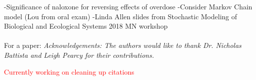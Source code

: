 \documentclass[12pt]{article}
\begin{document}
-Significance of naloxone for reversing effects of overdose 
-Consider Markov Chain model (Lou from oral exam) 
-Linda Allen slides from Stochastic Modeling of Biological and Ecological Systems 2018 MN workshop 
\\ \\
For a paper: \textit{Acknowledgements: The authors would like to thank Dr. Nicholas Battista and Leigh Pearcy for their contributions.}

\pagebreak

\textcolor{red}{Currently working on cleaning up citations} 




 
\end{document}
